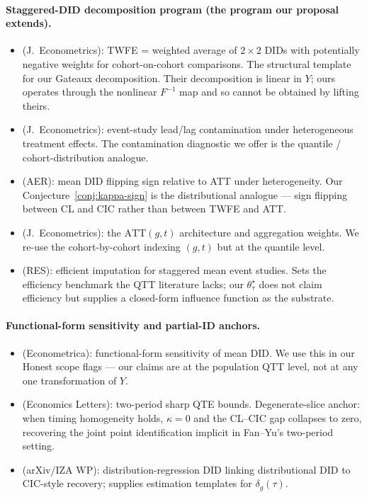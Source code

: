 \documentclass[11pt]{article}
\theoremstyle{definition}
\theoremstyle{plain}
\theoremstyle{remark}
\begin{document}
\paragraph{Staggered-DID decomposition program (the program our proposal extends).}
\begin{itemize}
  \item \citet{GoodmanBacon2021} (J.\ Econometrics): TWFE = weighted average of $2\!\times\!2$ DIDs with potentially negative weights for cohort-on-cohort comparisons. The structural template for our Gateaux decomposition. Their decomposition is linear in $Y$; ours operates through the nonlinear $F^{-1}$ map and so cannot be obtained by lifting theirs.
  \item \citet{SunAbraham2021} (J.\ Econometrics): event-study lead/lag contamination under heterogeneous treatment effects. The contamination diagnostic we offer is the quantile / cohort-distribution analogue.
  \item \citet{deChaisemartinDHaultfoeuille2020} (AER): mean DID flipping sign relative to ATT under heterogeneity. Our Conjecture~\ref{conj:kappa-sign} is the distributional analogue --- sign flipping between CL and CIC rather than between TWFE and ATT.
  \item \citet{CallawaySantAnna2021} (J.\ Econometrics): the $\mathrm{ATT}(g,t)$ architecture and aggregation weights. We re-use the cohort-by-cohort indexing $(g,t)$ but at the quantile level.
  \item \citet{BorusyakJaravelSpiess2024} (RES): efficient imputation for staggered mean event studies. Sets the efficiency benchmark the QTT literature lacks; our $\theta^\star_\tau$ does not claim efficiency but supplies a closed-form influence function as the substrate.
\end{itemize}

\paragraph{Functional-form sensitivity and partial-ID anchors.}
\begin{itemize}
  \item \citet{RothSantAnna2023} (Econometrica): functional-form sensitivity of mean DID. We use this in our Honest scope flags --- our claims are at the population QTT level, not at any one transformation of $Y$.
  \item \citet{FanYu2012} (Economics Letters): two-period sharp QTE bounds. Degenerate-slice anchor: when timing homogeneity holds, $\kappa = 0$ and the CL--CIC gap collapses to zero, recovering the joint point identification implicit in Fan--Yu's two-period setting.
  \item \citet{ChernozhukovFernandezValLuo2024} (arXiv/IZA WP): distribution-regression DID linking distributional DID to CIC-style recovery; supplies estimation templates for $\delta_g(\tau)$.
\end{itemize}
\end{document}
